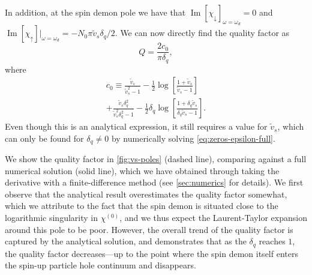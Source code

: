 \documentclass[aps,prb,reprint,twocolumns,superscriptaddress,nofootinbib]{revtex4-2}
\DeclareMathOperator{\Imm}{Im}
\begin{document}
	In addition, at the spin demon pole we have that $\Imm[\chi_\downarrow]_{\omega=\omega_d}=0$ and $\Imm[\chi_{\uparrow}]|_{\omega=\omega_d}=-N_0\pi \tilde v_s \delta_q/2$. We can now directly find the quality factor as
	\begin{equation}
		Q = \frac{2 c_0}{\pi\delta_q},
	\end{equation}
	where \begin{multline}
		c_0 \equiv \frac{\tilde v_s}{\tilde v_s^2 - 1} - \frac{1}{2} \log\left[\frac{1+\tilde v_s}{\tilde v_s-1} \right] \\
		+ \frac{\tilde v_s \delta_q^2}{\tilde v_s^2\delta_q^2-1}- \frac{1}{2} \delta_q \log\left[\frac{1+\delta_q\tilde v_s}{\delta_q\tilde v_s-1}\right].
	\end{multline}
	Even though this is an analytical expression, it still requires a value for $\tilde v_s$, which can only be found for $\delta_q\neq 0$ by numerically solving \cref{eq:zeros-epsilon-full}.
	
	We show the quality factor in \cref{fig:vs-poles} (dashed line), comparing against a full numerical solution (solid line), which we have obtained through taking the derivative with a finite-difference method (see \cref{sec:numerics} for details). We first observe that the analytical result overestimates the quality factor somewhat, which we attribute to the fact that the spin demon is situated close to the logarithmic singularity in $\chi^{(0)}$, and we thus expect the Laurent-Taylor expansion around this pole to be poor. However, the overall trend of the quality factor is captured by the analytical solution, and demonstrates that as the $\delta_q$ reaches $1$, the quality factor decreases---up to the point where the spin demon itself enters the spin-up particle hole continuum and disappears.
	
	
\end{document}
